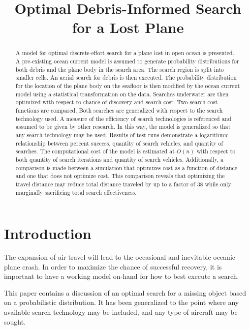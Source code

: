 \documentclass[a4paper]{article}
\title{Optimal Debris-Informed Search for a Lost Plane}
\author{}
\date{}
\begin{document}
\maketitle

\begin{abstract}
A model for optimal discrete-effort search for a plane lost in open ocean is presented. A pre-existing ocean current model is assumed to generate probability distributions for both debris and the plane body in the search area. The search region is split into smaller cells. An aerial search for debris is then executed. The probability distribution for the location of the plane body on the seafloor is then modified by the ocean current model using a statistical transformation on the data. Searches underwater are then optimized with respect to chance of discovery and search cost. Two search cost functions are compared. Both searches are generalized with respect to the search technology used. A measure of the efficiency of search technologies is referenced and assumed to be given by other research. In this way, the model is generalized so that any search technology may be used. Results of test runs demonstrate a logarithmic relationship between percent success, quantity of search vehicles, and quantity of searches. The computational cost of the model is estimated at $O(n)$ with respect to both quantity of search iterations and quantity of search vehicles. Additionally, a comparison is made between a simulation that optimizes cost as a function of distance and one that does not optimize cost. This comparison reveals that optimizing the travel distance may reduce total distance traveled by up to a factor of 38 while only marginally sacrificing total search effectiveness.
\end{abstract}

\pagebreak 

\section{Introduction}

The expansion of air travel will lead to the occasional and inevitable oceanic plane crash. In order to maximize the chance of successful recovery, it is important to have a working model on-hand for how to best execute a search. 

This paper contains a discussion of an optimal search for a missing object based on a probabilistic distribution. It has been generalized to the point where any available search technology may be included, and any type of aircraft may be sought.
\end{document}
